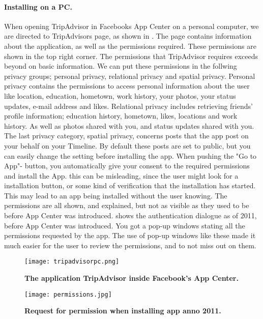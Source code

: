 \paragraph{Installing on a PC.}
When opening TripAdvisor in Facebooks App Center on a personal computer, we are directed to TripAdvisors page, as shown in . The page contains information about the application, as well as the permissions required. These permissions are shown in the top right corner. The permissions that TripAdvisor requires exceeds beyond on basic information. We can put these permissions in the follwing privacy groups; personal privacy, relational privacy and spatial privacy. Personal privacy contains the permissions to access personal information about the user like location, education, hometown, work history, your photos, your status updates, e-mail address and likes. Relational privacy includes retrieving friends' profile information; education history, hometown, likes, locations and work history. As well as photos shared with you, and status updates shared with you. The last privacy category, spatial privacy, concerns posts that the app post on your behalf on your Timeline. By default these posts are set to public, but you can easily change the setting before installing the app. When pushing the "Go to App"- button, you automatically give your consent to the required permissions and install the App. this can be misleading, since the user might look for a installation button, or some kind of verification that the installation has started. This may lead to an app being installed without the user knowing. The permissions are all shown, and explained, but not as visible as they used to be before App Center was introduced.  shows the authentication dialogue as of 2011, before App Center was introduced. You got a pop-up windows stating all the permissions requested by the app. The use of pop-up windows like these made it much easier for the user to review the permissions, and to not miss out on them. 

\begin{figure}[h!]
\centering
\texttt{[image: tripadvisorpc.png]}
\caption[The application TripAdvisor inside Facebook's App Center]{\textbf{The application TripAdvisor inside Facebook's App Center.} } 
\label{fig:tripadvisorpc}
\end{figure}

\begin{figure}[h!]
\centering
\texttt{[image: permissions.jpg]}
\caption[Request for permission when installing app anno 2011]{\textbf{Request for permission when installing app anno 2011.} } 
\label{fig:permissions2011}
\end{figure}

